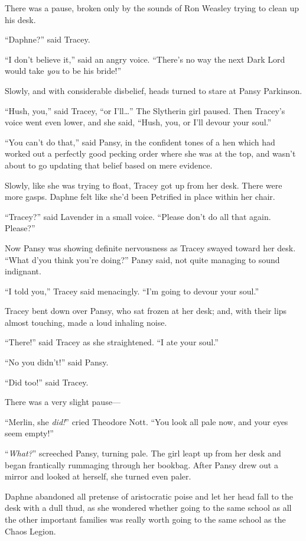 There was a pause, broken only by the sounds of Ron Weasley trying to clean up his desk.

“Daphne?” said Tracey.

“I don’t believe it,” said an angry voice. “There’s no way the next Dark Lord would take \emph{you} to be his bride!”

Slowly, and with considerable disbelief, heads turned to stare at Pansy Parkinson.

“Hush, you,” said Tracey, “or I’ll…” The Slytherin girl paused. Then Tracey’s voice went even lower, and she said, “Hush, you, or I’ll devour your soul.”

“You can’t do that,” said Pansy, in the confident tones of a hen which had worked out a perfectly good pecking order where she was at the top, and wasn’t about to go updating that belief based on mere evidence.

Slowly, like she was trying to float, Tracey got up from her desk. There were more gasps. Daphne felt like she’d been Petrified in place within her chair.

“Tracey?” said Lavender in a small voice. “Please don’t do all that again. Please?”

Now Pansy was showing definite nervousness as Tracey swayed toward her desk. “What d’you think you’re doing?” Pansy said, not quite managing to sound indignant.

“I told you,” Tracey said menacingly. “I’m going to devour your soul.”

Tracey bent down over Pansy, who sat frozen at her desk; and, with their lips almost touching, made a loud inhaling noise.

“There!” said Tracey as she straightened. “I ate your soul.”

“No you didn’t!” said Pansy.

“Did too!” said Tracey.

There was a very slight pause—

“Merlin, she \emph{did!}” cried Theodore Nott. “You look all pale now, and your eyes seem empty!”

“\emph{What?}” screeched Pansy, turning pale. The girl leapt up from her desk and began frantically rummaging through her bookbag. After Pansy drew out a mirror and looked at herself, she turned even paler.

Daphne abandoned all pretense of aristocratic poise and let her head fall to the desk with a dull thud, as she wondered whether going to the same school as all the other important families was really worth going to the same school as the Chaos Legion.

